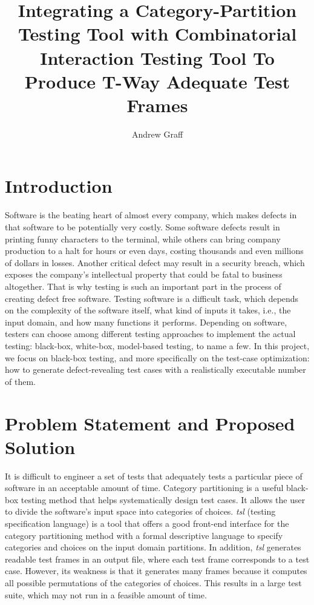 \documentclass[a4full,12pt]{article}
\title{Integrating a Category-Partition Testing Tool with Combinatorial Interaction
Testing Tool To Produce T-Way Adequate Test Frames}
\author{Andrew Graff}
\begin{document}
\maketitle
\section{Introduction}
Software is the beating heart of almost every company, which makes defects in that software
 to be potentially very costly. Some software defects result in printing funny characters to the terminal, while others can bring
  company production to a halt for hours or even days, costing thousands and even millions of
  dollars in losses. Another critical defect may result in a security breach, which exposes the company's intellectual property that
  could be fatal to business altogether. That is why testing is such an important part in
  the process of creating defect free software. Testing software is a difficult task, which
  depends on the complexity of the software itself, what kind of inputs it takes, i.e., the input domain, and how
  many functions it performs. Depending on software, testers can choose among different testing approaches
  to implement the actual testing: black-box, white-box, model-based testing, to name a few. In this project, we   
  focus on black-box testing, and more specifically on the test-case optimization: how to generate defect-revealing test cases with a realistically executable number of them.
  
\section{Problem Statement and Proposed Solution}
It is difficult to engineer a set of tests that adequately tests a particular piece of software
  in an acceptable amount of time. Category partitioning is a useful black-box testing method that
  helps systematically design test cases. It allows the user to divide
   the software's input space into categories of choices. \emph{tsl} (testing specification language) is a tool
  that offers a good front-end interface for the category partitioning method with a formal descriptive language
  to specify categories and choices on the input domain partitions. In addition, \emph{tsl} generates readable test frames in an output file, where each test frame corresponds to a test case. However, its weakness is that it generates many frames because it computes all possible permutations of the categories of choices. This results in a large test suite, which may not run in a feasible amount of time.
  
\end{document}

